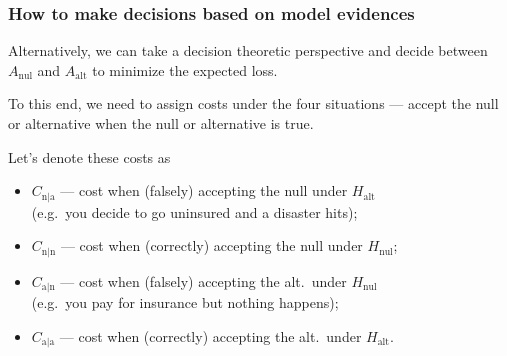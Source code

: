 \documentclass[18pt, handout]{beamer}
\newenvironment{tightItemize}[1][]{%
  \vspace{-.3\baselineskip}%
  \begin{itemize}[#1]
  \addtolength\itemsep{-.1\baselineskip}
}{
  \end{itemize}
}
\newcommand{\hypothesis}{H}
\renewcommand{\action}{A}
\newcommand{\nullSub}{\mathrm{nul}}
\newcommand{\altSub}{\mathrm{alt}}
\begin{document}
\begin{frame}
\frametitle{How to make decisions based on model evidences}
Alternatively, we can take a decision theoretic perspective and decide between $\action_\nullSub$ and $\action_\altSub$ to minimize the expected loss. 

To this end, we need to assign costs under the four situations --- accept the null or alternative when the null or alternative is true. 

Let's denote these costs as 
\begin{tightItemize}
\item $C_{\mathrm{n | a}}$ --- cost when (falsely) accepting the null under $\hypothesis_\altSub$ \\
	 (e.g.\ you decide to go uninsured and a disaster hits);
\item $C_{\mathrm{n | n}}$ --- cost when (correctly) accepting the null under $\hypothesis_\nullSub$; 
\item $C_{\mathrm{a | n}}$ --- cost when (falsely) accepting the alt.\ under $\hypothesis_\nullSub$ \\
	 (e.g.\ you pay for insurance but nothing happens);
\item $C_{\mathrm{a | a}}$ --- cost when (correctly) accepting the alt.\ under $\hypothesis_\altSub$.
\end{tightItemize}
\end{frame}
\end{document}
